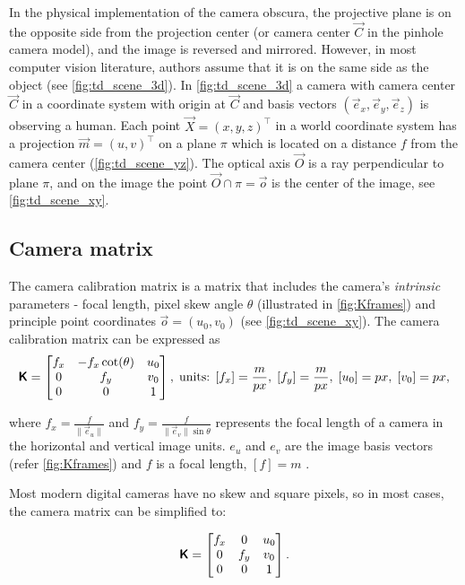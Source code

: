 In the physical implementation of the camera obscura, the projective plane is on the opposite side from the projection center (or camera center $\vec{C}$ in the pinhole camera model), and the image is reversed and mirrored. 
However, in most computer vision literature, authors assume that it is on the same side as the object (see \autoref{fig:td_scene_3d}).
In \autoref{fig:td_scene_3d} a camera with camera center $\vec{C}$ in a coordinate system with origin at $\vec{C}$ and basis vectors $(\vec{e}_x, \vec{e}_y, \vec{e}_z)$ is observing a human. 
Each point $\vec{X} = (x, y, z)^\top$ in a world coordinate system has a projection $\vec{m} = (u, v)^\top$ on a plane $\pi$ which is located on a distance $f$ from the camera center (\autoref{fig:td_scene_yz}). 
The optical axis $\vec{O}$ is a ray perpendicular to plane $\pi$, and on the image the point $ \vec{O} \cap \pi = \vec{o}$ is the center of the image, see \autoref{fig:td_scene_xy}.

\subsection{Camera matrix}
The camera calibration matrix is a matrix that includes the camera's \textit{intrinsic} parameters - focal length, pixel skew angle $\theta$ (illustrated in \autoref{fig:Kframes}) and principle point coordinates $\vec{o} = (u_0, v_0)$ (see \autoref{fig:td_scene_xy}).
The camera calibration matrix can be expressed as
\begin{equation}
    \pmb{\mathsf{K}} = \begin{bmatrix}
        f_x & -f_x \cot(\theta) & u_0 \\
        0 & f_y & v_0 \\
        0 & 0 & 1 \\
    \end{bmatrix},
    \textrm{\;units: } [f_x]=\frac{m}{px},\; [f_y]=\frac{m}{px},\; [u_0]=px,\; [v_0]=px,
\end{equation}

where $f_x = \frac{f}{\lVert \vec{e}_u \rVert} $ and $f_y = \frac{f}{\lVert \vec{e}_v \rVert \sin{\theta}}$ represents the focal length of a camera in the horizontal and vertical image units.
$e_u$ and $e_v$ are the image basis vectors (refer \autoref{fig:Kframes}) and $f$ is a focal length, $[f] = m$ .

Most modern digital cameras have no skew and square pixels, so in most cases, the camera matrix can be simplified to:

\begin{equation}
    \label{eq:kmat}
    \pmb{\mathsf{K}} = \begin{bmatrix}
        f_x & 0 & u_0 \\
        0 & f_y & v_0 \\
        0 & 0 & 1 \\
    \end{bmatrix}.
\end{equation}

